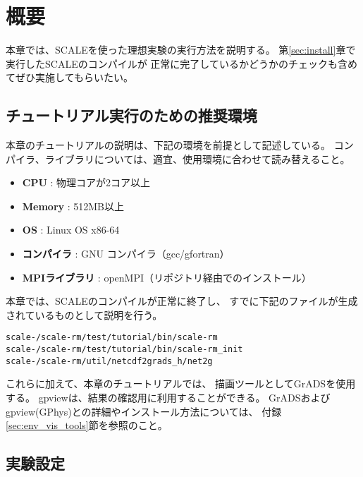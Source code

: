 
\section{概要}

本章では、SCALEを使った理想実験の実行方法を説明する。
第\ref{sec:install}章で実行したSCALEのコンパイルが
正常に完了しているかどうかのチェックも含めてぜひ実施してもらいたい。


\subsection{チュートリアル実行のための推奨環境}
\label{sec:assumed_env}

本章のチュートリアルの説明は、下記の環境を前提として記述している。
コンパイラ、ライブラリについては、適宜、使用環境に合わせて読み替えること。

\begin{itemize}
 \item {\bf CPU} : 物理コアが2コア以上 %
 \item {\bf Memory} : 512MB以上 %
 \item {\bf OS} : Linux OS x86-64  %
 \item {\bf コンパイラ} : GNU コンパイラ（gcc/gfortran）
 \item {\bf MPIライブラリ} : openMPI（リポジトリ経由でのインストール）
\end{itemize}

本章では、SCALEのコンパイルが正常に終了し、
すでに下記のファイルが生成されているものとして説明を行う。
\begin{alltt} 
  scale-{\version}/scale-rm/test/tutorial/bin/scale-rm
  scale-{\version}/scale-rm/test/tutorial/bin/scale-rm_init
  scale-{\version}/scale-rm/util/netcdf2grads_h/net2g
\end{alltt}
これらに加えて、本章のチュートリアルでは、
描画ツールとしてGrADSを使用する。
gpviewは、結果の確認用に利用することができる。
GrADSおよびgpview(GPhys)との詳細やインストール方法については、
付録 \ref{sec:env_vis_tools}節を参照のこと。


\subsection{実験設定}

